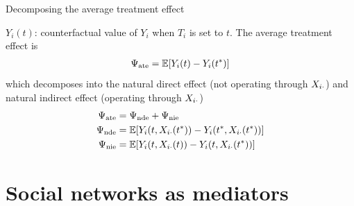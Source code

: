 \documentclass[aspectratio=169]{beamer}
\theoremstyle{remark}
\begin{document}
\begin{frame}{Decomposing the average treatment effect}

    $Y_i(t)$: counterfactual value of $Y_i$ when $T_i$ is set to $t$. The average treatment effect is
    \begin{align*}
        \ate = \E{Y_i(t) - Y_i(t^*)}
    \end{align*}
    which decomposes into the natural direct effect (not operating through $X_{i \cdot}$) and natural indirect effect (operating through $X_{i \cdot}$)
    \begin{align*}
        \ate & = \nde + \nie                                                    \\
        \nde & = \E{Y_i (t, \X_{i \cdot}(t^*)) - Y_i (t^*, \X_{i \cdot} (t^*))} \\
        \nie & = \E{Y_i (t, \X_{i \cdot}(t)) - Y_i (t, \X_{i \cdot} (t^*))}
    \end{align*}
\end{frame}

\section{Social networks as mediators}
\end{document}

